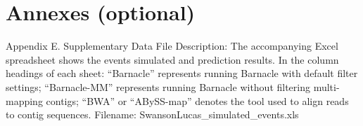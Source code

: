 \chapter{Annexes (optional)}

Appendix E.
Supplementary Data File
Description:
The accompanying Excel spreadsheet shows the events simulated and prediction
results. In the column headings of each sheet: “Barnacle” represents running Barnacle
with default filter settings; “Barnacle-MM” represents running Barnacle without filtering
multi-mapping contigs; “BWA” or “ABySS-map” denotes the tool used to align reads to
contig sequences.
Filename:
SwansonLucas_simulated_events.xls


